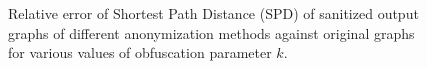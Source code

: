 \begin{figure}[!htb]
    \centering
    \vspace{-5pt}
    \caption{Relative error of Shortest Path Distance (SPD) of sanitized output graphs of different anonymization methods against original graphs for various values of obfuscation parameter $k$.}
    \label{fig:pathd}
\end{figure} 

